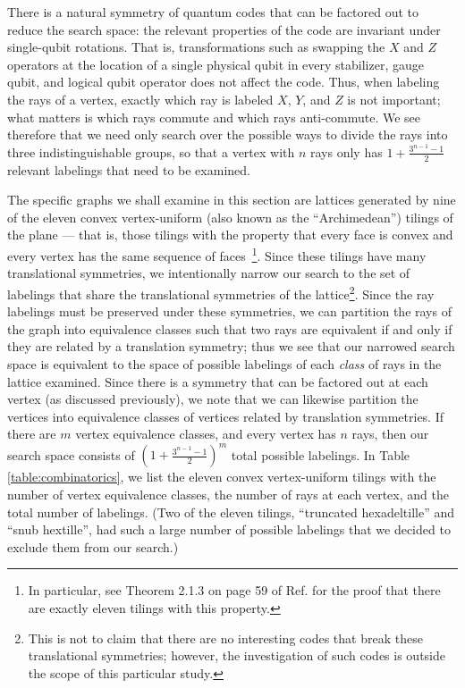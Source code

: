 \documentclass{amsbook}
\theoremstyle{plain}
\theoremstyle{definition}
\theoremstyle{remark}
\newcommand{\paren}[1]{\left(#1\right)}
\begin{document}
There is a natural symmetry of quantum codes that can be factored out to reduce the search space:  the relevant properties of the code are invariant under single-qubit rotations.  That is, transformations such as swapping the $X$ and $Z$ operators at the location of a single physical qubit in every stabilizer, gauge qubit, and logical qubit operator does not affect the code.  Thus, when labeling the rays of a vertex, exactly which ray is labeled $X$, $Y$, and $Z$ is not important;  what matters is which rays commute and which rays anti-commute.  We see therefore that we need only search over the possible ways to divide the rays into three indistinguishable groups, so that a vertex with $n$ rays only has $1+\frac{3^{n-1}-1}{2}$ relevant labelings that need to be examined.

The specific graphs we shall examine in this section are lattices generated by nine of the eleven convex vertex-uniform (also known as the ``Archimedean'') tilings of the plane --- that is, those tilings with the property that every face is convex and every vertex has the same sequence of faces~\cite{Gruenbaum1987}\footnote{In particular, see Theorem 2.1.3 on page 59 of Ref. \cite{Gruenbaum1987} for the proof that there are exactly eleven tilings with this property.}.  Since these tilings have many translational symmetries, we intentionally narrow our search to the set of labelings that share the translational symmetries of the lattice\footnote{This is not to claim that there are no interesting codes that break these translational symmetries;  however, the investigation of such codes is outside the scope of this particular study.}.  Since the ray labelings must be preserved under these symmetries, we can partition the rays of the graph into equivalence classes such that two rays are equivalent if and only if they are related by a translation symmetry;  thus we see that our narrowed search space is equivalent to the space of possible labelings of each \emph{class} of rays in the lattice examined.  Since there is a symmetry that can be factored out at each vertex (as discussed previously), we note that we can likewise partition the vertices into equivalence classes of vertices related by translation symmetries.  If there are $m$ vertex equivalence classes, and every vertex has $n$ rays, then our search space consists of $\paren{1+\frac{3^{n-1}-1}{2}}^m$ total possible labelings.  In Table \ref{table:combinatorics}, we list the eleven convex vertex-uniform tilings with the number of vertex equivalence classes, the number of rays at each vertex, and the total number of labelings.  (Two of the eleven tilings, ``truncated hexadeltille'' and ``snub hextille'', had such a large number of possible labelings that we decided to exclude them from our search.)
\end{document}

